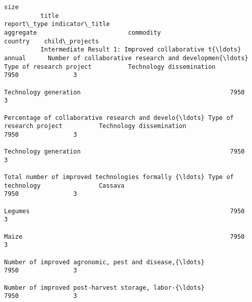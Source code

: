 \documentclass[11pt]{article}
\begin{document}
\begin{Verbatim}[commandchars=\\\{\}]
                                                                                                                                                                                                                                            size  
          title                                              report\_type indicator\_title                                    aggregate                         commodity                                          country    child\_projects        
          Intermediate Result 1: Improved collaborative t{\ldots} annual      Number of collaborative research and developmen{\ldots} Type of research project          Technology dissemination                                      7950               3  
                                                                                                                                                              Technology generation                                         7950               3  
                                                                         Percentage of collaborative research and develo{\ldots} Type of research project          Technology dissemination                                      7950               3  
                                                                                                                                                              Technology generation                                         7950               3  
                                                                         Total number of improved technologies formally {\ldots} Type of technology                Cassava                                                       7950               3  
                                                                                                                                                              Legumes                                                       7950               3  
                                                                                                                                                              Maize                                                         7950               3  
                                                                                                                                                              Number of improved agronomic, pest and disease,{\ldots}            7950               3  
                                                                                                                                                              Number of improved post-harvest storage, labor-{\ldots}            7950               3  

\end{Verbatim}
\end{document}
